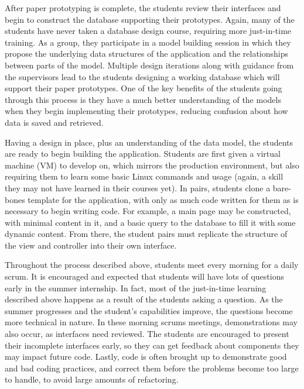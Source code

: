 After paper prototyping is complete, the students review their interfaces and begin to construct the database supporting their prototypes. Again, many of the students have never taken a database design course, requiring more just-in-time training. As a group, they participate in a model building session in which they propose the underlying data structures of the application and the relationships between parts of the model. Multiple design iterations along with guidance from the supervisors lead to the students designing a working database which will support their paper prototypes. One of the key benefits of the students going through this process is they have a much better understanding of the models when they begin implementing their prototypes, reducing confusion about how data is saved and retrieved. 

Having a design in place, plus an understanding of the data model, the students are ready to begin building the application. Students are first given a virtual machine (VM) to develop on, which mirrors the production environment, but also requiring them to learn some basic Linux commands and usage (again, a skill they may not have learned in their courses yet). In pairs, students clone a bare-bones template for the application, with only as much code written for them as is necessary to begin writing code. For example, a main page may be constructed, with minimal content in it, and a basic query to the database to fill it with some dynamic content. From there, the student pairs must replicate the structure of the view and controller into their own interface.

Throughout the process described above, students meet every morning for a daily scrum. It is encouraged and expected that students will have lots of questions early in the summer internship. In fact, most of the just-in-time learning described above happens as a result of the students asking a question. As the summer progresses and the student's capabilities improve, the questions become more technical in nature. In these morning scrums meetings, demonstrations may also occur, as interfaces need reviewed. The students are encouraged to present their incomplete interfaces early, so they can get feedback about components they may impact future code. Lastly, code is often brought up to demonstrate good and bad coding practices, and correct them before the problems become too large to handle, to avoid large amounts of refactoring. 

